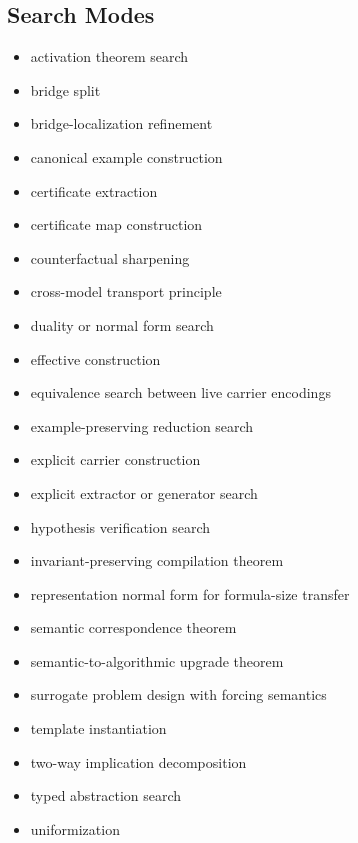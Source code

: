 \documentclass[11pt]{article}
\begin{document}
\subsection*{Search Modes}
\begin{itemize}[leftmargin=*,itemsep=0.2em]
\item activation theorem search
\item bridge split
\item bridge-localization refinement
\item canonical example construction
\item certificate extraction
\item certificate map construction
\item counterfactual sharpening
\item cross-model transport principle
\item duality or normal form search
\item effective construction
\item equivalence search between live carrier encodings
\item example-preserving reduction search
\item explicit carrier construction
\item explicit extractor or generator search
\item hypothesis verification search
\item invariant-preserving compilation theorem
\item representation normal form for formula-size transfer
\item semantic correspondence theorem
\item semantic-to-algorithmic upgrade theorem
\item surrogate problem design with forcing semantics
\item template instantiation
\item two-way implication decomposition
\item typed abstraction search
\item uniformization
\end{itemize}
\end{document}
